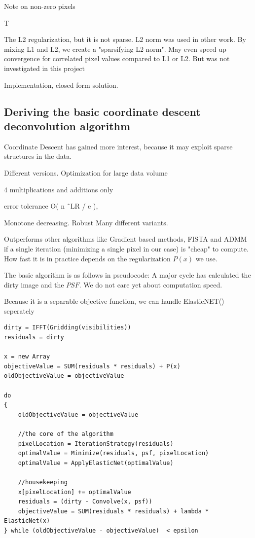 Note on non-zero pixels

T

The L2 regularization, but it is not sparse. L2 norm was used in other work. 
By mixing L1 and L2, we create a "sparsifying L2 norm". 
May even speed up convergence for correlated pixel values compared to L1 or L2. But was not investigated in this project





Implementation, closed form solution.


\subsection{Deriving the basic coordinate descent deconvolution algorithm}\label{cd:deriving}
Coordinate Descent has gained more interest, because it may exploit sparse structures in the data.

Different versions.
Optimization for large data volume\cite{richtarik2016distributed}

4 multiplications and additions only\cite{richtarik2012efficient}

error tolerance O( n ˜LR / e ), \cite{richtarik2016parallel}




Monotone decreasing.
Robust
Many different variants.

Outperforms other algorithms like Gradient based methods, FISTA and ADMM if a single iteration (minimizing a single pixel in our case) is "cheap" to compute. 
How fast it is in practice depends on the regularization $P(x)$ we use.

The basic algorithm is as follows in pseudocode: A major cycle has calculated the dirty image and the $PSF$. 
We do not care yet about computation speed.

Because it is a separable objective function, we can handle ElasticNET() seperately

\begin{lstlisting}
dirty = IFFT(Gridding(visibilities))
residuals = dirty

x = new Array
objectiveValue = SUM(residuals * residuals) + P(x)
oldObjectiveValue = objectiveValue

do 
{
	oldObjectiveValue = objectiveValue

	//the core of the algorithm
	pixelLocation = IterationStrategy(residuals)
	optimalValue = Minimize(residuals, psf, pixelLocation)
	optimalValue = ApplyElasticNet(optimalValue)
	
	//housekeeping
	x[pixelLocation] += optimalValue
	residuals = (dirty - Convolve(x, psf))
	objectiveValue = SUM(residuals * residuals) + lambda * ElasticNet(x)
} while (oldObjectiveValue - objectiveValue)  < epsilon
\end{lstlisting}

